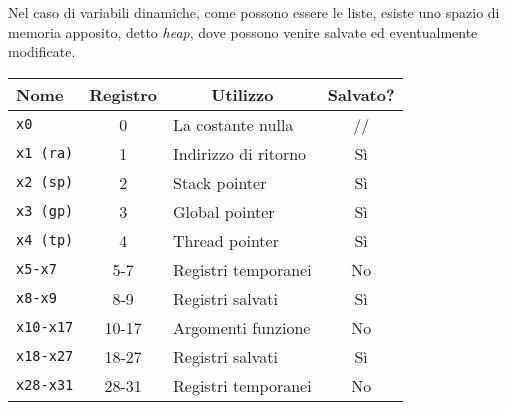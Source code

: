 \documentclass[a4paper,12pt]{article}
\theoremstyle{break}
\newcommand{\code}[1]{\texttt{#1}}
\numberwithin{equation}{section}
\begin{document}
Nel caso di variabili dinamiche, come possono essere le liste, esiste uno spazio di memoria apposito, detto \textit{heap}, dove possono venire salvate ed eventualmente modificate. 
\begin{center}
    \begin{tabular}{|l|c|l|c|}
        \hline
        Nome & Registro & \multicolumn{1}{|c|}{Utilizzo} & Salvato? \\
        \hline
        \code{x0} & 0 & La costante nulla & // \\
        \code{x1 (ra)} & 1 & Indirizzo di ritorno & Sì \\
        \code{x2 (sp)} & 2 & Stack pointer & Sì \\
        \code{x3 (gp)} & 3 & Global pointer & Sì \\
        \code{x4 (tp)} & 4 & Thread pointer & Sì \\
        \code{x5-x7} & 5-7 & Registri temporanei & No \\
        \code{x8-x9} & 8-9 & Registri salvati & Sì \\
        \code{x10-x17} & 10-17 & Argomenti funzione & No \\
        \code{x18-x27} & 18-27 & Registri salvati & Sì \\
        \code{x28-x31} & 28-31 & Registri temporanei & No \\
        \hline
    \end{tabular}
\end{center}
\end{document}
